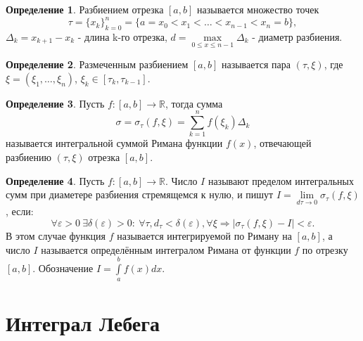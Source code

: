 \documentclass{book} %
\theoremstyle{definition}
\newtheorem{definition}{Определение}[chapter]
\theoremstyle{remark}
\begin{document}
		\begin{definition}
			Разбиением отрезка $[a,b]$ называется множество точек 
			$$
			\tau = \{x_k\}_{k=0}^{n} = \{a = x_0 < x_1 < \dots < x_{n-1} < x_n = b\},
			$$
			$\Delta_k = x_{k+1}-x_k$ - длина k-го отрезка, $d = \max\limits_{0 \leq x \leq n-1 } \Delta_k$ - диаметр разбиения.
		\end{definition}
		\begin{definition}
			Размеченным разбиением $[a,b]$ называется пара $(\tau, \xi)$, где $\xi = (\xi_1, \dots, \xi_{n})$, $\xi_k \in [\tau_k, \tau_{k-1}]$.
		\end{definition}
		\begin{definition}
			Пусть $f: [a,b] \to \mathbb{R}$, тогда сумма
			$$
			\sigma = \sigma_\tau(f, \xi) = \sum\limits_{k=1}^{n} f(\xi_k) \Delta_k
			$$
			называется интегральной суммой Римана функции $f(x)$, отвечающей разбиению $(\tau, \xi)$ отрезка $[a,b]$.
		\end{definition}
		\begin{definition}
			Пусть $f: [a,b] \to \mathbb{R}$. Число $I$ называют пределом интегральных сумм при диаметере разбиения стремящемся к нулю, и пишут $I = \lim\limits_{d\tau \to 0} \sigma_\tau(f, \xi)$, если:
			$$
				\forall \varepsilon > 0 \ \exists \delta(\varepsilon) > 0: \ \forall \tau, d_\tau < \delta(\varepsilon), \forall \xi \Rightarrow |\sigma_\tau(f, \xi) - I| < \varepsilon.
			$$
			В этом случае функция $f$ называется интегрируемой по Риману на $[a,b]$, а число $I$ называется определённым интегралом Римана от функции $f$ по отрезку $[a,b]$. Обозначение $I = \int\limits_a^b f(x) dx$.
		\end{definition}
	\chapter{Интеграл Лебега}
	
	
\end{document}
